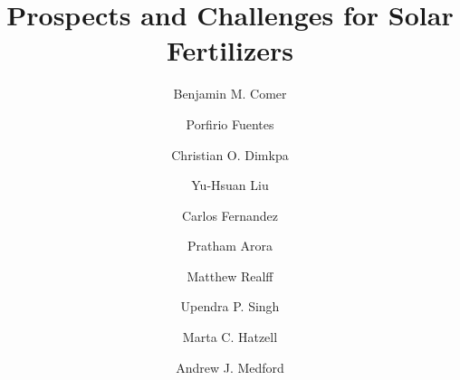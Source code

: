 \documentclass[final,1p,times,twocolumn]{elsarticle}
\begin{document}
\begin{frontmatter}


\title{Prospects and Challenges for Solar Fertilizers}




\author[GTChBE]{Benjamin M. Comer}
\author[IFDC]{Porfirio Fuentes}
\author[IFDC]{Christian O. Dimkpa}
\author[GTEE]{Yu-Hsuan Liu}
\author[GTME]{Carlos Fernandez}
\author[GTChBE]{Pratham Arora}
\author[GTChBE]{Matthew Realff}
\author[IFDC]{Upendra P. Singh}
\author[GTME]{Marta C. Hatzell}
\author[GTChBE]{Andrew J. Medford}

\address[GTChBE]{School of Chemical \& Biomolecular Engineering, Georgia Institute of Technology, Atlanta, GA 30318}

\address[GTME]{School of Mechanical Engineering, Georgia Institute of Technology, Atlanta, GA 30318}

\address[GTEE]{School of Environmental Engineering, Georgia Institute of Technology, Atlanta, GA 30318}

\address[IFDC]{International Fertilizer Development Center, Muscle Shoals, AL 35661}


\begin{abstract}


\end{abstract}
\end{frontmatter}
\end{document}

